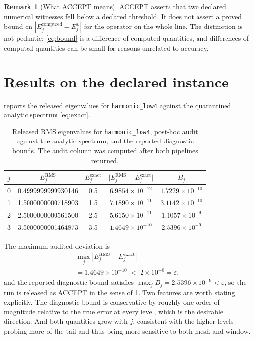 \documentclass[twocolumn,10pt,a4paper]{article}
\theoremstyle{plain}
\theoremstyle{definition}
\newtheorem{remark}{Remark}
\newcommand{\R}{\mathbb{R}}
\newcommand{\eps}{\varepsilon}
\newcommand{\ACCEPT}{\textsf{ACCEPT}}
\begin{document}
\begin{remark}[What \ACCEPT{} means]
\label{rem:acceptmeaning}
\ACCEPT{} asserts that two declared numerical witnesses fell below a declared
threshold. It does not assert a proved bound on
$|E_{j}^{\mathrm{computed}} - E_{j}^{\R}|$ for the operator on the whole line.
The distinction is not pedantic: \eqref{eq:bound} is a difference of computed
quantities, and differences of computed quantities can be small for reasons
unrelated to accuracy.
\end{remark}

\section{Results on the declared instance}
\label{sec:results}

 reports the released eigenvalues for \texttt{harmonic\_low4}
against the quarantined analytic spectrum \eqref{eq:exact}.

\begin{table}[t]
\centering
\caption{Released RMS eigenvalues for \texttt{harmonic\_low4}, post-hoc audit
against the analytic spectrum, and the reported diagnostic bounds. The audit
column was computed after both pipelines returned.}
\label{tab:results}
\begin{tabular}{c l c c c}
\toprule
$j$ & \multicolumn{1}{c}{$E_{j}^{\mathrm{RMS}}$} & $E_{j}^{\mathrm{exact}}$ &
$\big|E_{j}^{\mathrm{RMS}} - E_{j}^{\mathrm{exact}}\big|$ & $B_{j}$ \\
\midrule
0 & 0.4999999999930146 & 0.5 & $6.9854\times10^{-12}$ & $1.7229\times10^{-10}$\\
1 & 1.5000000000718903 & 1.5 & $7.1890\times10^{-11}$ & $3.1142\times10^{-10}$\\
2 & 2.5000000000561500 & 2.5 & $5.6150\times10^{-11}$ & $1.1057\times10^{-9}$\\
3 & 3.5000000001464873 & 3.5 & $1.4649\times10^{-10}$ & $2.5396\times10^{-9}$\\
\bottomrule
\end{tabular}
\end{table}

The maximum audited deviation is
\begin{equation}
\begin{gathered}
\max_{j}\left|E_{j}^{\mathrm{RMS}} - E_{j}^{\mathrm{exact}}\right|\\
= 1.4649\times10^{-10} \;<\; 2\times10^{-8} = \eps,
\end{gathered}
\end{equation}
and the reported diagnostic bound satisfies
$\max_{j} B_{j} = 2.5396\times10^{-9} < \eps$, so the run is released as
\ACCEPT{} in the sense of \cref{rem:acceptmeaning}. Two features are worth
stating explicitly. The diagnostic bound is conservative by roughly one order of
magnitude relative to the true error at every level, which is the desirable
direction. And both quantities grow with $j$, consistent with the higher levels
probing more of the tail and thus being more sensitive to both mesh and window.
\end{document}
